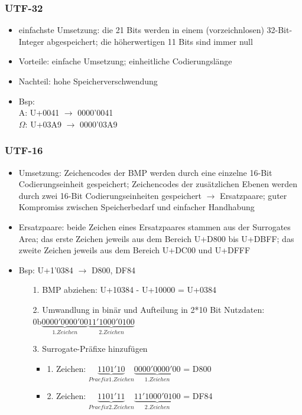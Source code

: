 \documentclass[a4paper,10pt]{article}
\begin{document}
\subsubsection{UTF-32}
\begin{itemize}
\item einfachste Umsetzung: die 21 Bits werden in einem (vorzeichnlosen) 32-Bit-Integer abgespeichert; die h\"oherwertigen 11 Bits sind immer null
\item Vorteile: einfache Umsetzung; einheitliche Codierungsl\"ange
\item Nachteil: hohe Speicherverschwendung
\item Bsp: \\ A: U+0041 $\to$ 0000'0041 \\ $\Omega$: U+03A9 $\to$ 0000'03A9
\end{itemize}

\subsubsection{UTF-16}
\begin{itemize}
\item Umsetzung: Zeichencodes der BMP werden durch eine einzelne 16-Bit Codierungseinheit gespeichert; Zeichencodes der zus\"atzlichen Ebenen werden durch zwei 16-Bit Codierungseinheiten gespeichert $\to$ Ersatzpaare; guter Kompromiss zwischen Speicherbedarf und einfacher Handhabung
\item Ersatzpaare: beide Zeichen eines Ersatzpaares stammen aus der Surrogates Area; das erste Zeichen jeweils aus dem Bereich U+D800 bis U+DBFF; das zweite Zeichen jeweils aus dem Bereich U+DC00 und U+DFFF
\item Bsp: U+1'0384 $\to$ D800, DF84
    \begin{itemize}
    \item[1.] BMP abziehen: U+10384 - U+10000 = U+0384
    \item[2.] Umwandlung in bin\"ar und Aufteilung in 2*10 Bit Nutzdaten: \\
    0b$\underbrace{0000'0000'00}_{1. Zeichen} \underbrace{11'1000'0100}_{2. Zeichen}$
    \item[3.] Surrogate-Pr\"afixe hinzuf\"ugen\\
        \begin{itemize}
        \item 1. Zeichen: $\underbrace{1101'10}_{Praefix 1. Zeichen} \underbrace{0000'0000'00}_{1. Zeichen} $ = D800
        \item 2. Zeichen: $\underbrace{1101'11}_{Praefix 2. Zeichen} \underbrace{11'1000'0100}_{2. Zeichen} $ = DF84
        \end{itemize}
    \end{itemize}

\end{itemize}
\end{document}
